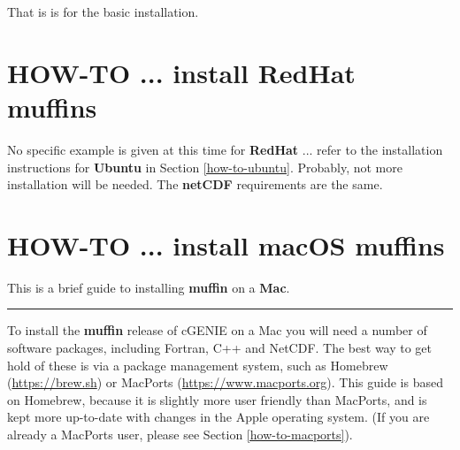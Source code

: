 \documentclass[11pt,fleqn]{book} %
\begin{document}
\noindent That is is for the basic installation.


\newpage


\section{HOW-TO ... install RedHat muffins}\label{how-to-redhat}
\vspace{2mm}


No specific example is given at this time for \textbf{RedHat} ... refer to the installation instructions for \textbf{Ubuntu} in Section \ref{how-to-ubuntu}. Probably, not more installation will be needed. The \textbf{netCDF} requirements are the same.


\newpage


\section{HOW-TO ... install macOS muffins}\label{how-to-macos}
\vspace{2mm}

This is a brief guide to installing \textbf{muffin} on a \textbf{Mac}.

\vspace{1mm}
\noindent\rule{4cm}{0.1mm}
\vspace{2mm}

\noindent To install the \textbf{muffin} release of cGENIE on a Mac you will need a number of software packages, including Fortran, C++ and NetCDF. The best way to get hold of these is via a package management system, such as Homebrew (\href{}{https://brew.sh}) or MacPorts (\href{}{https://www.macports.org}). This guide is based on Homebrew, because it is slightly more user friendly than MacPorts, and is kept more up-to-date with changes in the Apple operating system. (If you are already a MacPorts user, please see Section \ref{how-to-macports}).
\end{document}
